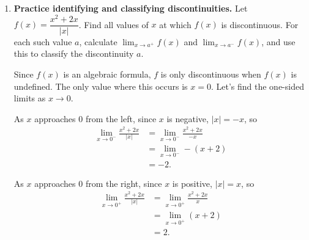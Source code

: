 \documentclass[main]{subfiles}
\begin{document}
\begin{enumerate}[resume]
\begin{solution}
      This gives us the following sign chart.
      \begin{center}
      \end{center}
      Since $f'$ is negative on the interval $(-2, 0)$, $f$ is decreasing on the interval
      $(-2, 0)$.
  \end{solution}

\item 

  \begin{problem}[\vfill\newpage]
    \textbf{Practice identifying and classifying discontinuities.} Let $f(x) = \dfrac{x^2 + 2x}{|x|}$. Find all values of $x$ at which $f(x)$ is discontinuous. For each such value $a$, calculate $\displaystyle \lim_{x \to a^+} f(x)$ and $\displaystyle \lim_{x \to a^-} f(x)$, and use this to classify the discontinuity $a$. 
  \end{problem}

  \begin{solution}
    Since $f(x)$ is an algebraic formula, $f$ is only discontinuous when $f(x)$ is undefined.
    The only value where this occurs is $x=0$. Let's find the one-sided limits as $x \to 0$.

    As $x$ approaches $0$ from the left, since $x$ is negative, $|x| = -x$, so
    \begin{align*}
        \lim_{x\to 0^-} \frac{x^2+2x}{|x|} &= \lim_{x\to 0^-} \frac{x^2+2x}{-x} \\
        &= \lim_{x\to 0^-} -(x+2) \\
        &= -2.
    \end{align*}
    
    As $x$ approaches $0$ from the right, since $x$ is positive, $|x| = x$, so
    \begin{align*}
        \lim_{x\to 0^+} \frac{x^2+2x}{|x|} &= \lim_{x\to 0^+} \frac{x^2+2x}{x} \\
        &= \lim_{x\to 0^+} (x+2) \\
        &= 2.
    \end{align*}


\end{solution}
\end{enumerate}
\end{document}
